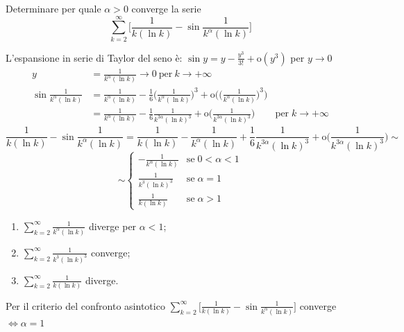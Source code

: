 \begin{exbar}
	\begin{example}
		Determinare per quale $\alpha>0$ converge la serie 
		\begin{equation*}
			\sum_{k=2}^\infty \bigg[\frac{1}{k(\ln k)} - \sin \frac{1}{k^\alpha(\ln k)} \bigg]
		\end{equation*}
		
		L'espansione in serie di Taylor del seno è: $\sin y = y - \frac{y^3}{3!} + \mathrm{o}(y^3)$ per $y\rightarrow0$
		\begin{align*}
			y &= \frac{1}{k^\alpha(\ln k)} \rightarrow 0 \ \text{per} \ k\rightarrow+\infty
			\\
			\sin \frac{1}{k^\alpha (\ln k)}
			&= \frac{1}{k^\alpha (\ln k)} - \frac{1}{6} \bigg(\frac{1}{k^\alpha (\ln k)} \bigg)^3 + \mathrm{o}\bigg( \bigg(\frac{1}{k^\alpha (\ln k)} \bigg)^3 \bigg) 
			\\
			&= \frac{1}{k^\alpha (\ln k)} - \frac{1}{6} \frac{1}{k^{3\alpha}(\ln k)^3} + \mathrm{o}\bigg(\frac{1}{k^{3\alpha}(\ln k)^3} \bigg) & \mathrm{per} \; k \rightarrow + \infty
		\end{align*}
		\begin{equation*}
		\frac{1}{k (\ln k)} - \sin\frac{1}{k^\alpha(\ln k)} = \frac{1}{k (\ln k)} -\frac{1}{k^\alpha (\ln k)} + \frac{1}{6} \frac{1}{k^{3\alpha}(\ln k)^3} + \mathrm{o}\bigg(\frac{1}{k^{3\alpha}(\ln k)^3} \bigg) \sim
		\end{equation*}
		\begin{equation*}
			\sim \begin{cases}
				-\frac{1}{k^\alpha (\ln k)} & \mathrm{se} \; 0<\alpha<1 
				\\[1em]
				\frac{1}{k^3(\ln k)^3} & \mathrm{se} \; \alpha = 1 
				\\[1em]
				\frac{1}{k (\ln k)} & \mathrm{se} \; \alpha > 1
			\end{cases}
		\end{equation*}
		
		\begin{enumerate}
			\item $\sum_{k=2}^\infty \frac{1}{k^\alpha (\ln k)}$ diverge per $\alpha < 1$;
			\item $\sum_{k=2}^\infty \frac{1}{k^3 (\ln k)^3}$ converge;
			\item $\sum_{k=2}^\infty \frac{1}{k (\ln k)}$ diverge.
		\end{enumerate}
		
		Per il criterio del confronto asintotico
		$\sum_{k=2}^\infty \bigg[\frac{1}{k (\ln k)} - \sin \frac{1}{k^\alpha (\ln k)} \bigg]$ converge $\iff \alpha=1$
	\end{example}
\end{exbar}

